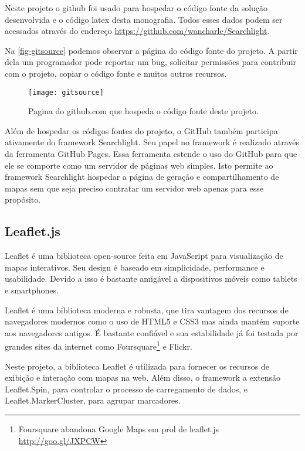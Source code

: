 Neste projeto o github foi usado para hospedar o código fonte da solução desenvolvida e o código latex desta monografia. Todos esses dados podem ser acessados através do endereço \url{https://github.com/wancharle/Searchlight}. 

Na \autoref{fig-gitsource} podemos observar a página do código fonte do projeto. A partir dela um programador pode reportar um bug, solicitar permissões para contribuir com o projeto, copiar o código fonte e muitos outros recursos. 

	\begin{figure}[htb]
	\caption{\label{fig-gitsource}Pagina do github.com que hospeda o código fonte deste projeto.}
	\begin{center}
	    \texttt{[image: gitsource]}
	\end{center}
\end{figure}

Além de hospedar os códigos fontes do projeto, o GitHub também participa ativamente do framework Searchlight. Seu papel no framework é realizado através da ferramenta GitHub Pages. Essa ferramenta estende o uso do GitHub para que ele se comporte como um servidor de páginas web simples. Isto permite ao framework Searchlight hospedar a página de geração e compartilhamento de mapas sem que seja preciso contratar um servidor web apenas para esse propósito.


\subsection{Leaflet.js}

Leaflet é uma biblioteca open-source feita em JavaScript para visualização de mapas interativos. Seu design é baseado em simplicidade, performance e usabilidade. Devido a isso é bastante amigável a dispositivos móveis como tablets e smartphones.

Leaflet é uma biblioteca moderna e robusta, que tira vantagem dos recursos de navegadores modernos como o uso de HTML5  e CSS3 mas ainda mantém suporte aos navegadores antigos.  É bastante confiável e sua estabilidade já foi testada por grandes sites da internet como Foursquare\footnote{Foursquare abandona Google Maps em prol de leaflet.js \url{http://goo.gl/JXPCW}} e Flickr.

Neste projeto, a biblioteca Leaflet é utilizada para fornecer os recursos de exibição e interação com mapas na web.  Além disso, o framework a extensão  Leaflet.Spin, para controlar o processo de carregamento de dados, e Leaflet.MarkerCluster, para agrupar marcadores.


